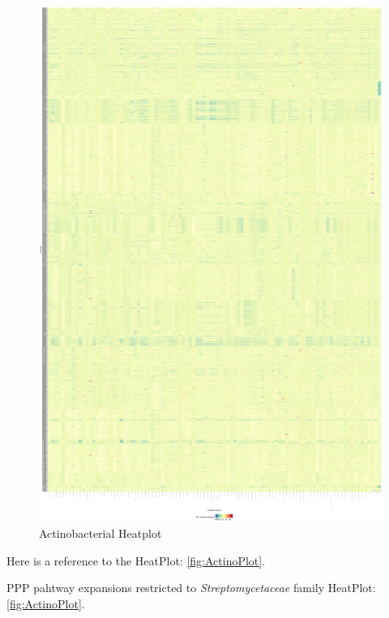 \documentclass[12pt,twoside]{reedthesis}
\begin{document}
  \begin{figure}[h!tbp]
  \centering
  \includegraphics[angle = 0,scale = 0.7]{chapter2/Actinobacteria/HeatPlotActinos.pdf}
  \caption[Actinobacterial Heatplot]{\normalsize{Actinobacterial Heatplot}}
  \label{fig:ActinoPlot}
  \end{figure}
  
  Here is a reference to the HeatPlot: \autoref{fig:ActinoPlot}.
  \clearpage 
  
  PPP pahtway expansions restricted to \emph{Streptomycetaceae} family
  HeatPlot: \autoref{fig:ActinoPlot}.
  
\end{document}
